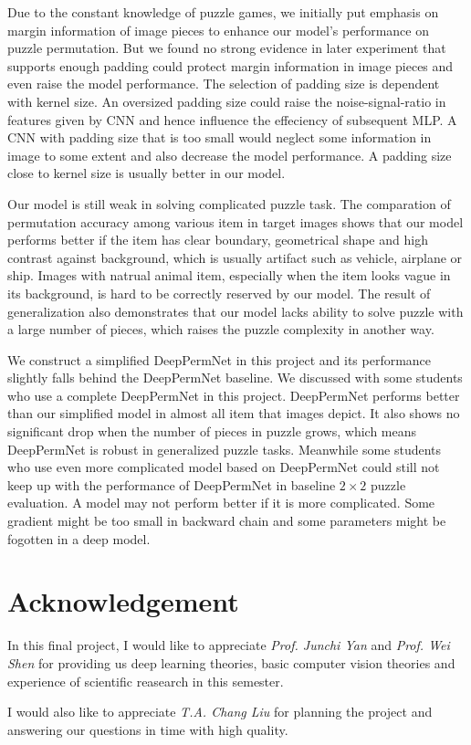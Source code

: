 \documentclass[twocolumn]{article}
\begin{document}
Due to the constant knowledge of puzzle games, we initially put emphasis on margin information of image pieces 
to enhance our model's performance on puzzle permutation. But we found no strong evidence in later experiment 
that supports enough padding could protect margin information in image pieces and even raise the model 
performance. The selection of padding size is dependent with kernel size. An oversized padding size could 
raise the noise-signal-ratio in features given by CNN and hence influence the effeciency of subsequent MLP. 
A CNN with padding size that is too small would neglect some information in image to some extent and also 
decrease the model performance. A padding size close to kernel size is usually better in our model. 

Our model is still weak in solving complicated puzzle task. The comparation of permutation accuracy among 
various item in target images shows that our model performs better if the item has clear boundary, geometrical 
shape and high contrast against background, which is usually artifact such as vehicle, airplane or ship. Images 
with natrual animal item, especially when the item looks vague in its background, is hard to be correctly 
reserved by our model. The result of generalization also demonstrates that our model lacks ability to solve 
puzzle with a large number of pieces, which raises the puzzle complexity in another way. 

We construct a simplified DeepPermNet in this project and its performance slightly falls behind the DeepPermNet 
baseline. We discussed with some students who use a complete DeepPermNet in this project. DeepPermNet performs 
better than our simplified model in almost all item that images depict. It also shows no significant drop when 
the number of pieces in puzzle grows, which means DeepPermNet is robust in generalized puzzle tasks. Meanwhile 
some students who use even more complicated model based on DeepPermNet could still not keep up with the 
performance of DeepPermNet in baseline $2\times 2$ puzzle evaluation. A model may not perform better if it 
is more complicated. Some gradient might be too small in backward chain and some parameters might be fogotten 
in a deep model. 
\section{Acknowledgement}
In this final project, I would like to appreciate \textit{Prof. Junchi Yan} and \textit{Prof. Wei Shen} for 
providing us deep learning theories, basic computer vision theories and experience of scientific reasearch in 
this semester. 

I would also like to appreciate \textit{T.A. Chang Liu} for planning the project and answering our questions 
in time with high quality. 

\end{document}
